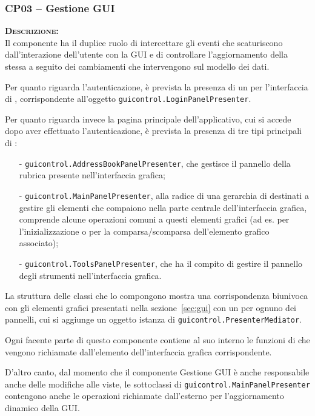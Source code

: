 \subsubsection{CP03 -- Gestione GUI}
\begin{description}
	\item{\scshape\bfseries Descrizione:}\\
Il componente ha il duplice ruolo di intercettare gli eventi che scaturiscono dall'interazione dell'utente con la GUI e di controllare l'aggiornamento della stessa a seguito dei cambiamenti che intervengono sul modello dei dati.

Per quanto riguarda l'autenticazione, è prevista la presenza di un  per l'interfaccia di , corrispondente all'oggetto \texttt{guicontrol.LoginPanelPresenter}.

Per quanto riguarda invece la pagina principale dell'applicativo, cui si accede dopo aver effettuato l'autenticazione, è prevista la presenza di tre tipi principali di :
\begin{itemize}[noitemsep,nolistsep]
  \item[-] \texttt{guicontrol.AddressBookPanelPresenter}, che gestisce il pannello della rubrica presente nell'interfaccia grafica;
  \item[-] \texttt{guicontrol.MainPanelPresenter}, alla radice di una gerarchia di  destinati a gestire gli elementi che compaiono nella parte centrale dell'interfaccia grafica, comprende alcune operazioni comuni a questi elementi grafici (ad es. per l'inizializzazione o per la comparsa/scomparsa dell'elemento grafico associato);
  \item[-] \texttt{guicontrol.ToolsPanelPresenter}, che ha il compito di gestire il pannello degli strumenti nell'interfaccia grafica.
\end{itemize}

La struttura delle classi che lo compongono mostra una corrispondenza biunivoca con gli elementi grafici presentati nella sezione~\ref{sec:gui} con un  per ognuno dei pannelli, cui si aggiunge un oggetto istanza di \texttt{guicontrol.PresenterMediator}.

Ogni  facente parte di questo componente contiene al suo interno le funzioni di  che vengono richiamate dall'elemento dell'interfaccia grafica corrispondente.

D'altro canto, dal momento che il componente \textsf{Gestione GUI} è anche responsabile anche delle modifiche alle viste, le sottoclassi di \texttt{guicontrol.MainPanelPresenter} contengono anche le operazioni richiamate dall'esterno per l'aggiornamento dinamico della GUI\@.


\end{description}

